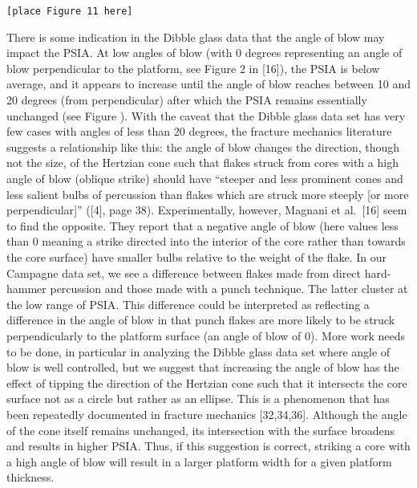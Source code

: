 \documentclass[10pt,letterpaper]{article}
\begin{document}
\begin{verbatim}
[place Figure 11 here]
\end{verbatim}

There is some indication in the Dibble glass data that the angle of blow
may impact the PSIA. At low angles of blow (with 0 degrees representing
an angle of blow perpendicular to the platform, see Figure 2 in
{[}16{]}), the PSIA is below average, and it appears to increase until
the angle of blow reaches between 10 and 20 degrees (from perpendicular)
after which the PSIA remains essentially unchanged (see Figure ). With
the caveat that the Dibble glass data set has very few cases with angles
of less than 20 degrees, the fracture mechanics literature suggests a
relationship like this: the angle of blow changes the direction, though
not the size, of the Hertzian cone such that flakes struck from cores
with a high angle of blow (oblique strike) should have ``steeper and
less prominent cones and less salient bulbs of percussion than flakes
which are struck more steeply {[}or more perpendicular{]}'' ({[}4{]},
page 38). Experimentally, however, Magnani et al.~{[}16{]} seem to find
the opposite. They report that a negative angle of blow (here values
less than 0 meaning a strike directed into the interior of the core
rather than towards the core surface) have smaller bulbs relative to the
weight of the flake. In our Campagne data set, we see a difference
between flakes made from direct hard-hammer percussion and those made
with a punch technique. The latter cluster at the low range of PSIA.
This difference could be interpreted as reflecting a difference in the
angle of blow in that punch flakes are more likely to be struck
perpendicularly to the platform surface (an angle of blow of 0). More
work needs to be done, in particular in analyzing the Dibble glass data
set where angle of blow is well controlled, but we suggest that
increasing the angle of blow has the effect of tipping the direction of
the Hertzian cone such that it intersects the core surface not as a
circle but rather as an ellipse. This is a phenomenon that has been
repeatedly documented in fracture mechanics {[}32,34,36{]}. Although the
angle of the cone itself remains unchanged, its intersection with the
surface broadens and results in higher PSIA. Thus, if this suggestion is
correct, striking a core with a high angle of blow will result in a
larger platform width for a given platform thickness.
\end{document}
